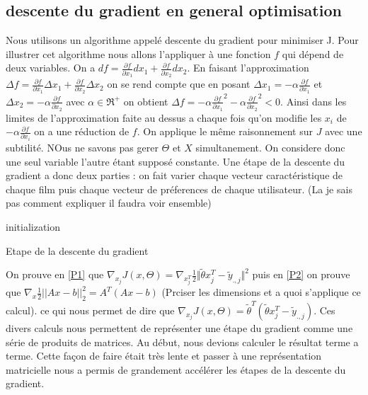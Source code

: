 \documentclass[a4paper,10pt]{article}
\begin{document}
\subsection{descente du gradient en general optimisation}
Nous utilisons un algorithme appelé descente du gradient pour minimiser J. Pour illustrer cet algorithme nous allons l'appliquer 
à une fonction $f$ qui dépend de deux variables.%
 On a $df = \frac{\partial f}{\partial x_{1}}d x_{1} + \frac{\partial f}{\partial x_{2}}dx_{2}$. En faisant l'approximation
 $\Delta f = \frac{\partial f}{\partial x_{1}}\Delta  x_{1} + \frac{\partial f}{\partial x_{2}}\Delta x_{2}$ on se rend compte
 que en posant $\Delta x_{1} = -\alpha \frac{\partial f}{\partial x_{1}}$
 et $\Delta x_{2} = -\alpha \frac{\partial f}{\partial x_{2}}$ avec $\alpha \in \Re^{+}$
 on obtient $\Delta f = -\alpha \frac{\partial f}{\partial x_{1}}^{2} - \alpha \frac{\partial f}{\partial x_{2}}^{2} < 0$. Ainsi dans
 les limites de l'approximation faite au dessus a chaque fois qu'on modifie les $x_{i}$ de $- \alpha \frac{\partial f}{\partial x_{i}}$
 on a une réduction de $f$.
On applique le même raisonnement sur $J$ avec une subtilité. NOus ne savons pas gerer $\Theta$ et $X$ simultanement. On considere donc une
seul variable l'autre étant supposé constante. Une étape de la descente du gradient a donc deux parties :  on fait varier chaque vecteur caractéristique de chaque film
puis chaque vecteur de préferences de chaque utilisateur. (La je sais pas comment expliquer il faudra voir ensemble)

\begin{algorithm}[H]
 initialization\;
 
 \caption{Etape de la descente du gradient}
\end{algorithm}
On prouve en \ref{P1} que $ \nabla_{x_{j}}J(x, \Theta) = \nabla_{x_{j}^T}\frac{1}{2}\Vert\tilde{\theta}x_{j}^{T}-\tilde{y}_{.,j}\Vert^{2}$
puis en \ref{P2} on prouve que $\nabla_{x} \frac{1}{2}||Ax - b||^{2}_{2} = A^{T}(Ax - b)$ (Prciser les dimensions et a quoi s'applique ce calcul). ce qui nous permet de dire
que $ \nabla_{x_{j}}J(x, \Theta) =  \tilde{\theta}^{T}(\tilde{\theta}x_{j}^{T}-\tilde{y}_{.,j})$. Ces divers calculs nous permettent
de représenter une étape du gradient comme une série de produits de matrices. Au début, nous devions calculer le résultat terme a terme. Cette
façon de faire était très lente et passer à une représentation matricielle nous a permis de grandement accélérer les étapes de la descente du gradient.
\end{document}
